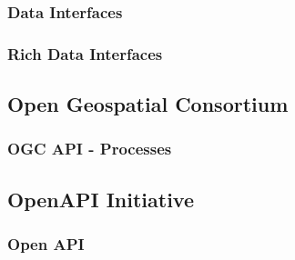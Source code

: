\subsubsection{Data Interfaces}
\subsubsection{Rich Data Interfaces}

\subsection{Open Geospatial Consortium}
\subsubsection{OGC API - Processes}
\subsection{OpenAPI Initiative}
\subsubsection{Open API}